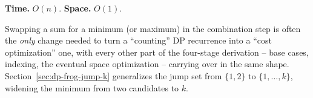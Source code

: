 \begin{complexitybox}
\textbf{Time.} $O(n)$.
\textbf{Space.} $O(1)$.
\end{complexitybox}

\begin{takeawaybox}
Swapping a sum for a minimum (or maximum) in the combination step is
often the \emph{only} change needed to turn a ``counting'' DP recurrence
into a ``cost optimization'' one, with every other part of the four-stage
derivation -- base cases, indexing, the eventual space optimization --
carrying over in the same shape. Section~\ref{sec:dp-frog-jump-k}
generalizes the jump set from $\{1,2\}$ to $\{1,\ldots,k\}$, widening the
minimum from two candidates to $k$.
\end{takeawaybox}
